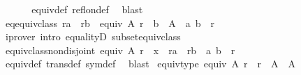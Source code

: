 \begin{isabellebody}
\ \ %
\isanewline
%
\isadelimproof
\ \ %
\endisadelimproof
%
\isatagproof
{}\isamarkupfalse%
\ equiv{\isacharunderscore}{\kern0pt}def\ refl{\isacharunderscore}{\kern0pt}on{\isacharunderscore}{\kern0pt}def\ \isamarkupfalse%
\ blast%
\endisatagproof
{\isafoldproof}%
%
\isadelimproof
\isanewline
%
\endisadelimproof
\isanewline
{}\isamarkupfalse%
\ eq{\isacharunderscore}{\kern0pt}equiv{\isacharunderscore}{\kern0pt}class{\isacharcolon}{\kern0pt}\ {\isachardoublequoteopen}r{\isacharbackquote}{\kern0pt}{\isacharbackquote}{\kern0pt}{\isacharbraceleft}{\kern0pt}a{\isacharbraceright}{\kern0pt}\ {\isacharequal}{\kern0pt}\ r{\isacharbackquote}{\kern0pt}{\isacharbackquote}{\kern0pt}{\isacharbraceleft}{\kern0pt}b{\isacharbraceright}{\kern0pt}\ {\isasymLongrightarrow}\ equiv\ A\ r\ {\isasymLongrightarrow}\ b\ {\isasymin}\ A\ {\isasymLongrightarrow}\ {\isacharparenleft}{\kern0pt}a{\isacharcomma}{\kern0pt}\ b{\isacharparenright}{\kern0pt}\ {\isasymin}\ r{\isachardoublequoteclose}\isanewline
%
\isadelimproof
\ \ %
\endisadelimproof
%
\isatagproof
{}\isamarkupfalse%
\ {\isacharparenleft}{\kern0pt}iprover\ intro{\isacharcolon}{\kern0pt}\ equalityD{}\ subset{\isacharunderscore}{\kern0pt}equiv{\isacharunderscore}{\kern0pt}class{\isacharparenright}{\kern0pt}%
\endisatagproof
{\isafoldproof}%
%
\isadelimproof
\isanewline
%
\endisadelimproof
\isanewline
{}\isamarkupfalse%
\ equiv{\isacharunderscore}{\kern0pt}class{\isacharunderscore}{\kern0pt}nondisjoint{\isacharcolon}{\kern0pt}\ {\isachardoublequoteopen}equiv\ A\ r\ {\isasymLongrightarrow}\ x\ {\isasymin}\ {\isacharparenleft}{\kern0pt}r{\isacharbackquote}{\kern0pt}{\isacharbackquote}{\kern0pt}{\isacharbraceleft}{\kern0pt}a{\isacharbraceright}{\kern0pt}\ {\isasyminter}\ r{\isacharbackquote}{\kern0pt}{\isacharbackquote}{\kern0pt}{\isacharbraceleft}{\kern0pt}b{\isacharbraceright}{\kern0pt}{\isacharparenright}{\kern0pt}\ {\isasymLongrightarrow}\ {\isacharparenleft}{\kern0pt}a{\isacharcomma}{\kern0pt}\ b{\isacharparenright}{\kern0pt}\ {\isasymin}\ r{\isachardoublequoteclose}\isanewline
%
\isadelimproof
\ \ %
\endisadelimproof
%
\isatagproof
{}\isamarkupfalse%
\ equiv{\isacharunderscore}{\kern0pt}def\ trans{\isacharunderscore}{\kern0pt}def\ sym{\isacharunderscore}{\kern0pt}def\ \isamarkupfalse%
\ blast%
\endisatagproof
{\isafoldproof}%
%
\isadelimproof
\isanewline
%
\endisadelimproof
\isanewline
{}\isamarkupfalse%
\ equiv{\isacharunderscore}{\kern0pt}type{\isacharcolon}{\kern0pt}\ {\isachardoublequoteopen}equiv\ A\ r\ {\isasymLongrightarrow}\ r\ {\isasymsubseteq}\ A\ {\isasymtimes}\ A{\isachardoublequoteclose}\isanewline

\end{isabellebody}
